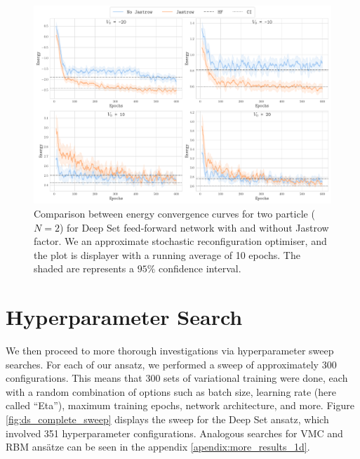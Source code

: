 \begin{figure}[H]
    \centering
    \includegraphics[width=1\linewidth]{Chapters/Results/N2/dsffnn_jastrow_energy_convergence_v0_all.pdf}
    \caption{Comparison between energy convergence curves for two particle ($N = 2$) for Deep Set feed-forward network with and without Jastrow factor. We an approximate stochastic reconfiguration optimiser, and the plot is displayer with a running average of 10 epochs. The shaded are represents a $95\%$ confidence interval.}
    \label{fig:jastrow}
\end{figure}

\section{Hyperparameter Search}\label{sec:sweep1d}

We then proceed to more thorough investigations via hyperparameter sweep searches. For each of our ansatz, we performed a sweep of approximately 300 configurations. This means that 300 sets of variational training were done, each with a random combination of options such as batch size, learning rate (here called ``Eta''), maximum training epochs, network architecture, and more. Figure \ref{fig:ds_complete_sweep} displays the sweep for the Deep Set ansatz, which involved 351 hyperparameter configurations. Analogous searches for VMC and RBM ansätze can be seen in the appendix \ref{apendix:more_results_1d}.

